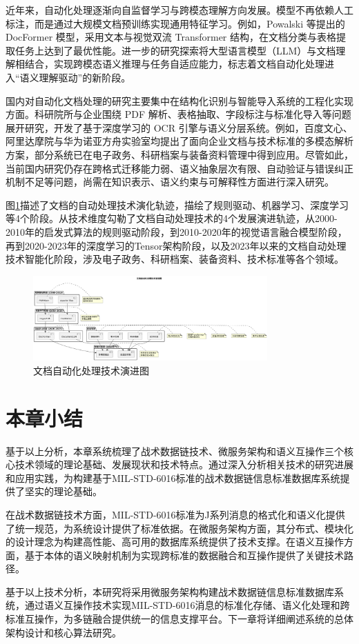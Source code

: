 近年来，自动化处理逐渐向自监督学习与跨模态理解方向发展。模型不再依赖人工标注，而是通过大规模文档预训练实现通用特征学习。例如，Powalski 等提出的 DocFormer 模型\cite{Powalski2021DocFormer}，采用文本与视觉双流 Transformer 结构，在文档分类与表格提取任务上达到了最优性能。进一步的研究探索将大型语言模型（LLM）与文档理解相结合，实现跨模态语义推理与任务自适应能力\cite{Wang2023DocumentLLM}，标志着文档自动化处理进入“语义理解驱动”的新阶段。

国内对自动化文档处理的研究主要集中在结构化识别与智能导入系统的工程化实现方面。科研院所与企业围绕 PDF 解析、表格抽取、字段标注与标准化导入等问题展开研究，开发了基于深度学习的 OCR 引擎与语义分层系统。例如，百度文心、阿里达摩院与华为诺亚方舟实验室均提出了面向企业文档与技术标准的多模态解析方案，部分系统已在电子政务、科研档案与装备资料管理中得到应用。尽管如此，当前国内研究仍存在跨格式迁移能力弱、语义抽象层次有限、自动验证与错误纠正机制不足等问题，尚需在知识表示、语义约束与可解释性方面进行深入研究。

图\ref{fig_document_processing_evolution}描述了文档的自动处理技术演化轨迹，描绘了规则驱动、机器学习、深度学习等4个阶段。从技术维度勾勒了文档自动处理技术的4个发展演进轨迹，从2000-2010年的启发式算法的规则驱动阶段，到2010-2020年的视觉语言融合模型阶段，再到2020-2023年的深度学习的Tensor架构阶段，以及2023年以来的文档自动处理技术智能化阶段，涉及电子政务、科研档案、装备资料、技术标准等各个领域。

\begin{figure}[H]
    \centering
    \includegraphics[width=0.8\textwidth,height=0.6\textheight,keepaspectratio]{chapters/fig-0/document_processing_evolution.png}
    \caption{文档自动化处理技术演进图}
    \label{fig_document_processing_evolution}
\end{figure}

\section{本章小结}

基于以上分析，本章系统梳理了战术数据链技术、微服务架构和语义互操作三个核心技术领域的理论基础、发展现状和技术特点。通过深入分析相关技术的研究进展和应用实践，为构建基于MIL-STD-6016标准的战术数据链信息标准数据库系统提供了坚实的理论基础。

在战术数据链技术方面，MIL-STD-6016标准为J系列消息的格式化和语义化提供了统一规范，为系统设计提供了标准依据。在微服务架构方面，其分布式、模块化的设计理念为构建高性能、高可用的数据库系统提供了技术支撑。在语义互操作方面，基于本体的语义映射机制为实现跨标准的数据融合和互操作提供了关键技术路径。

基于以上技术分析，本研究将采用微服务架构构建战术数据链信息标准数据库系统，通过语义互操作技术实现MIL-STD-6016消息的标准化存储、语义化处理和跨标准互操作，为多链融合提供统一的信息支撑平台。下一章将详细阐述系统的总体架构设计和核心算法研究。

